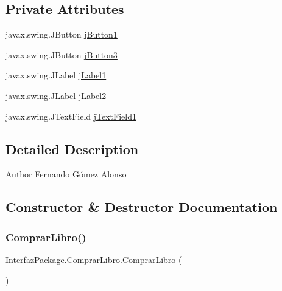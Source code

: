\subsection*{Private Attributes}
\begin{DoxyCompactItemize}
\item 
javax.\+swing.\+J\+Button \mbox{\hyperlink{class_interfaz_package_1_1_comprar_libro_add5c058f4090954bd33f186540441d18}{j\+Button1}}
\item 
javax.\+swing.\+J\+Button \mbox{\hyperlink{class_interfaz_package_1_1_comprar_libro_a911d2c0fd76d0d219563ebd3ddc851b0}{j\+Button3}}
\item 
javax.\+swing.\+J\+Label \mbox{\hyperlink{class_interfaz_package_1_1_comprar_libro_a6f76d43eea40102ddff5d882389f306e}{j\+Label1}}
\item 
javax.\+swing.\+J\+Label \mbox{\hyperlink{class_interfaz_package_1_1_comprar_libro_ae3f9a64fb4e0e0131c4ccee88f410226}{j\+Label2}}
\item 
javax.\+swing.\+J\+Text\+Field \mbox{\hyperlink{class_interfaz_package_1_1_comprar_libro_aefb13deeb30da3f6668b192b74c20705}{j\+Text\+Field1}}
\end{DoxyCompactItemize}


\subsection{Detailed Description}
\begin{DoxyAuthor}{Author}
Fernando Gómez Alonso 
\end{DoxyAuthor}


\subsection{Constructor \& Destructor Documentation}
\mbox{\label{class_interfaz_package_1_1_comprar_libro_aa2b72bc79a74662e97fd03629929e6b6}} 
\subsubsection{\texorpdfstring{Comprar\+Libro()}{ComprarLibro()}}
{\footnotesize\ttfamily Interfaz\+Package.\+Comprar\+Libro.\+Comprar\+Libro (\begin{DoxyParamCaption}{ }\end{DoxyParamCaption})\hspace{0.3cm}{\ttfamily [inline]}}

